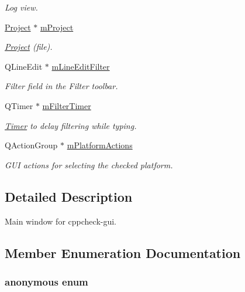 \begin{DoxyCompactItemize}
\begin{DoxyCompactList}\small\item\em Log view. \end{DoxyCompactList}\item 
\hyperlink{class_project}{Project} $\ast$ \hyperlink{class_main_window_a556c03edd946d60bc426f184d2604678}{m\-Project}
\begin{DoxyCompactList}\small\item\em \hyperlink{class_project}{Project} (file). \end{DoxyCompactList}\item 
Q\-Line\-Edit $\ast$ \hyperlink{class_main_window_a87a6c80c7093eb0ddc41d70fea129b18}{m\-Line\-Edit\-Filter}
\begin{DoxyCompactList}\small\item\em Filter field in the Filter toolbar. \end{DoxyCompactList}\item 
Q\-Timer $\ast$ \hyperlink{class_main_window_a727873c771d824448c4b28e0a362ac4e}{m\-Filter\-Timer}
\begin{DoxyCompactList}\small\item\em \hyperlink{class_timer}{Timer} to delay filtering while typing. \end{DoxyCompactList}\item 
Q\-Action\-Group $\ast$ \hyperlink{class_main_window_ac66bc9bf2832c507bb49e07c7b8a2dd1}{m\-Platform\-Actions}
\begin{DoxyCompactList}\small\item\em G\-U\-I actions for selecting the checked platform. \end{DoxyCompactList}\end{DoxyCompactItemize}


\subsection{Detailed Description}
Main window for cppcheck-\/gui. 

\subsection{Member Enumeration Documentation}
\hypertarget{class_main_window_a97b4dedaa96eb7c2b44ac65d9396f058}{\subsubsection[{anonymous enum}]{\setlength{\rightskip}{0pt plus 5cm}anonymous enum}}\label{class_main_window_a97b4dedaa96eb7c2b44ac65d9396f058}


